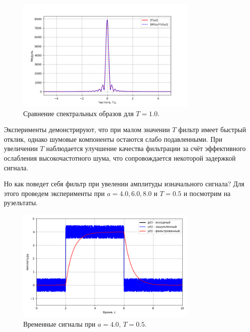 \documentclass[a4paper]{article}
\begin{document}
\begin{figure}[H]
  \centering
  \includegraphics[width=0.8\textwidth]{src/task_1_1/spec_comp_2.0_1.0.png}
  \caption{Сравнение спектральных образов для \(T=1.0\).}
  \label{fig:speccomp_1.0}
\end{figure}

Эксперименты демонстрируют, что при малом значении \(T\) фильтр имеет быстрый отклик, однако шумовые компоненты остаются слабо подавленными. При увеличении \(T\) наблюдается улучшение качества фильтрации за счёт эффективного ослабления высокочастотного шума, что сопровождается некоторой задержкой сигнала.

Но как поведет себя фильтр при увелении амплитуды изначального сигнала? Для этого проведем эксперименты при \(a={4.0, 6.0, 8.0}\) и \(T=0.5\) и посмотрим на рузельтаты.

\begin{figure}[H]
  \centering
  \includegraphics[width=0.8\textwidth]{src/task_1_1/time_4.0_0.5.png}
  \caption{Временные сигналы при \(a=4.0\), \(T=0.5\).}
\end{figure}
\end{document}
